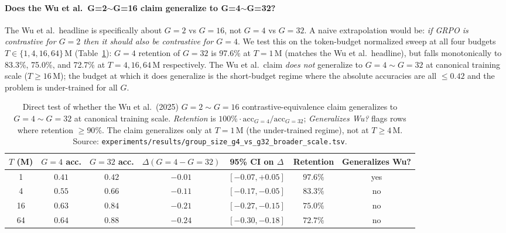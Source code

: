 \paragraph{Does the Wu et al.\ G=2$\sim$G=16 claim generalize to G=4$\sim$G=32?}
The Wu et al.\ headline is specifically about $G{=}2$ vs $G{=}16$, not
$G{=}4$ vs $G{=}32$. A naive extrapolation would be: \emph{if GRPO is
contrastive for $G{=}2$ then it should also be contrastive for
$G{=}4$}. We test this on the token-budget normalized sweep at all four
budgets $T \in \{1, 4, 16, 64\}\,$M (Table~\ref{tab:groupsize-g4-g32}):
$G{=}4$ retention of $G{=}32$ is 97.6\% at $T{=}1\,$M (matches the Wu
et al.\ headline), but falls monotonically to 83.3\%, 75.0\%, and
72.7\% at $T{=}4, 16, 64\,$M respectively. The Wu et al.\ claim
\emph{does not} generalize to $G{=}4 \sim G{=}32$ at canonical
training scale ($T \ge 16\,$M); the budget at which it does generalize
is the short-budget regime where the absolute accuracies are all
$\le 0.42$ and the problem is under-trained for all $G$.

\begin{table}[htbp]
\centering
\small
\begin{tabular}{ccccccc}
\toprule
$T$ (M) & $G{=}4$ acc. & $G{=}32$ acc. & $\Delta(G{=}4{-}G{=}32)$ & 95\% CI on $\Delta$ & Retention & Generalizes Wu? \\
\midrule
1  & $0.41$ & $0.42$ & $-0.01$ & $[-0.07, +0.05]$ & $\mathbf{97.6\%}$ & yes \\
4  & $0.55$ & $0.66$ & $-0.11$ & $[-0.17, -0.05]$ & $83.3\%$          & no  \\
16 & $0.63$ & $0.84$ & $-0.21$ & $[-0.27, -0.15]$ & $75.0\%$          & no  \\
64 & $0.64$ & $0.88$ & $-0.24$ & $[-0.30, -0.18]$ & $\mathbf{72.7\%}$ & no  \\
\bottomrule
\end{tabular}
\caption{Direct test of whether the Wu et al.\ (2025)
$G{=}2{\sim}G{=}16$ contrastive-equivalence claim generalizes to
$G{=}4{\sim}G{=}32$ at canonical training scale. \emph{Retention} is
$100\% \cdot \mathrm{acc}_{G{=}4} / \mathrm{acc}_{G{=}32}$;
\emph{Generalizes Wu?} flags rows where retention $\ge 90\%$. The
claim generalizes only at $T{=}1\,$M (the under-trained regime), not at
$T \ge 4\,$M. Source: \texttt{experiments/results/group\_size\_g4\_vs\_g32\_broader\_scale.tsv}.}
\label{tab:groupsize-g4-g32}
\end{table}

